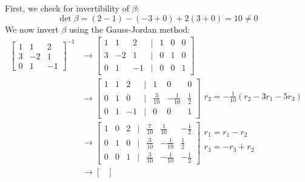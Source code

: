 \documentclass[12pt]{article}
\begin{document}
\begin{enumerate}
        First, we check for invertibility of $\beta$:
        \[ \det \beta =(2-1)-(-3+0)+2(3+0)=10\neq 0\]
        We now invert $\beta$ using the Gauss-Jordan method:
        \begin{align*}
            \begin{bmatrix}
                 1&1&2 \\ 3&-2&1 \\ 0&1&-1
                \end{bmatrix}^{-1} 
            &\to \begin{bmatrix}
                   1&1&2 &|& 1&0&0 
                    \\  3&-2&1  &|& 0&1&0
                    \\0&1&-1 &|& 0&0&1
                \end{bmatrix}
            \\ &\to \begin{bmatrix}
                   1&1&2 &|& 1&0&0 
                    \\  0 & 1&0  &|& \frac{3}{10}&-\frac{1}{10}&\frac{1}{2}
                    \\0&1&-1 &|& 0&0&1
                \end{bmatrix}\begin{matrix}
                    \\  r_2 = -\frac{1}{10} (r_2 - 3r_1 -5r_3)
                    \\%
                    \\ 
                \end{matrix}
            \\ &\to \begin{bmatrix}
                   1&0&2 &|& \frac{7}{10}&\frac{1}{10}&-\frac{1}{2}
                    \\  0 & 1&0  &|& \frac{3}{10}&-\frac{1}{10}&\frac{1}{2}
                    \\0&0&1 &|&\frac{3}{10}&-\frac{1}{10}&-\frac{1}{2}
                \end{bmatrix}\begin{matrix}
                    r_1 = r_1 -r_2
                    \\ %
                    \\r_3=-r_3+r_2
                    \\ 
                \end{matrix}
            \\ &\to \begin{bmatrix}

\end{bmatrix}
\end{align*}
\end{enumerate}
\end{document}
